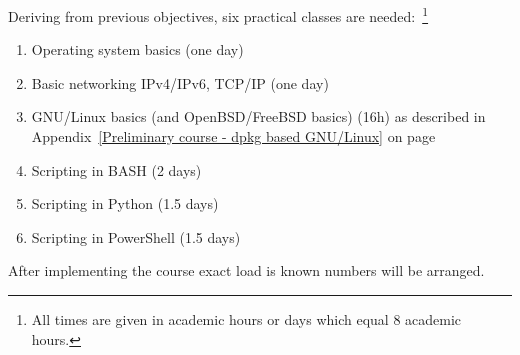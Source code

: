 Deriving from previous objectives, six practical classes are needed:~\footnote{All times are given in academic hours or days which equal 8 academic hours.}

\begin{enumerate}[label=LAB \arabic*.,leftmargin=*]
\item Operating system basics (one day)
\item Basic networking IPv4/IPv6, TCP/IP (one day)
\item GNU/Linux basics (and OpenBSD/FreeBSD basics) (16h) as described in Appendix~\ref{Preliminary course - dpkg based GNU/Linux} on page~\pageref{Preliminary course - dpkg based GNU/Linux}
\item Scripting in BASH (2 days)
\item Scripting in Python (1.5 days)
\item Scripting in PowerShell (1.5 days)
\end{enumerate}
After implementing the course exact load is known numbers will be arranged.

